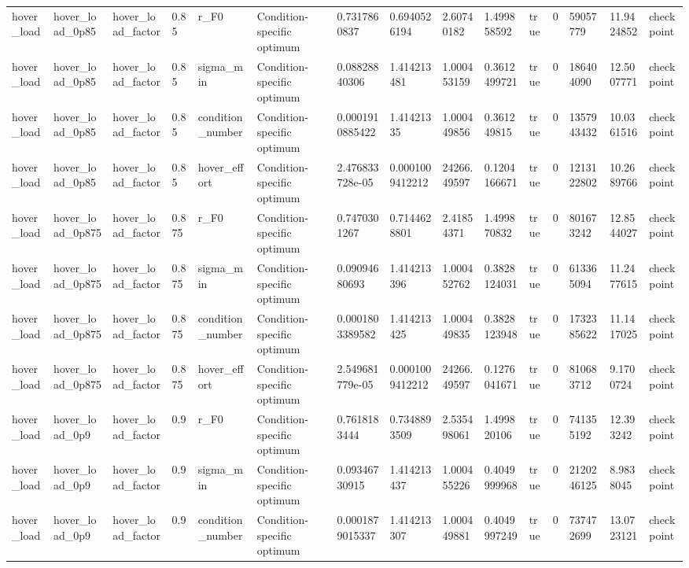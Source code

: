\begin{tabular}{@{}lllllllllllllll@{}}
hover\_load & hover\_load\_0p85 & hover\_load\_factor & 0.85 & r\_F0 & Condition-specific optimum & 0.7317860837 & 0.6940526194 & 2.60740182 & 1.499858592 & true & 0 & 59057779 & 11.9424852 & checkpoint \\
hover\_load & hover\_load\_0p85 & hover\_load\_factor & 0.85 & sigma\_min & Condition-specific optimum & 0.08828840306 & 1.414213481 & 1.000453159 & 0.3612499721 & true & 0 & 186404090 & 12.5007771 & checkpoint \\
hover\_load & hover\_load\_0p85 & hover\_load\_factor & 0.85 & condition\_number & Condition-specific optimum & 0.0001910885422 & 1.41421335 & 1.000449856 & 0.361249815 & true & 0 & 1357943432 & 10.0361516 & checkpoint \\
hover\_load & hover\_load\_0p85 & hover\_load\_factor & 0.85 & hover\_effort & Condition-specific optimum & 2.476833728e-05 & 0.0001009412212 & 24266.49597 & 0.1204166671 & true & 0 & 1213122802 & 10.2689766 & checkpoint \\
hover\_load & hover\_load\_0p875 & hover\_load\_factor & 0.875 & r\_F0 & Condition-specific optimum & 0.7470301267 & 0.7144628801 & 2.41854371 & 1.499870832 & true & 0 & 801673242 & 12.8544027 & checkpoint \\
hover\_load & hover\_load\_0p875 & hover\_load\_factor & 0.875 & sigma\_min & Condition-specific optimum & 0.09094680693 & 1.414213396 & 1.000452762 & 0.3828124031 & true & 0 & 613365094 & 11.2477615 & checkpoint \\
hover\_load & hover\_load\_0p875 & hover\_load\_factor & 0.875 & condition\_number & Condition-specific optimum & 0.0001803389582 & 1.414213425 & 1.000449835 & 0.3828123948 & true & 0 & 1732385622 & 11.1417025 & checkpoint \\
hover\_load & hover\_load\_0p875 & hover\_load\_factor & 0.875 & hover\_effort & Condition-specific optimum & 2.549681779e-05 & 0.0001009412212 & 24266.49597 & 0.1276041671 & true & 0 & 810683712 & 9.1700724 & checkpoint \\
hover\_load & hover\_load\_0p9 & hover\_load\_factor & 0.9 & r\_F0 & Condition-specific optimum & 0.7618183444 & 0.7348893509 & 2.535498061 & 1.499820106 & true & 0 & 741355192 & 12.393242 & checkpoint \\
hover\_load & hover\_load\_0p9 & hover\_load\_factor & 0.9 & sigma\_min & Condition-specific optimum & 0.09346730915 & 1.414213437 & 1.000455226 & 0.4049999968 & true & 0 & 2120246125 & 8.9838045 & checkpoint \\
hover\_load & hover\_load\_0p9 & hover\_load\_factor & 0.9 & condition\_number & Condition-specific optimum & 0.0001879015337 & 1.414213307 & 1.000449881 & 0.4049997249 & true & 0 & 737472699 & 13.0723121 & checkpoint \\

\end{tabular}
